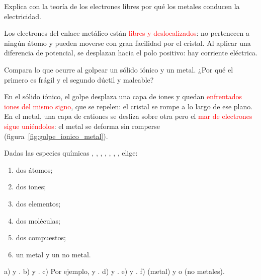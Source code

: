 \begin{exercise}
    Explica con la teoría de los electrones libres por qué los metales conducen la electricidad.
    \begin{solu}
        Los electrones del enlace metálico están \textcolor{red}{libres y deslocalizados}: no pertenecen a ningún átomo y pueden moverse con gran facilidad por el cristal. Al aplicar una diferencia de potencial, se desplazan hacia el polo positivo: hay corriente eléctrica.
    \end{solu}
\end{exercise}

\begin{exercise}
    Compara lo que ocurre al golpear un sólido iónico y un metal. ¿Por qué el primero es frágil y el segundo dúctil y maleable?
    \begin{solu}
        En el sólido iónico, el golpe desplaza una capa de iones y quedan \textcolor{red}{enfrentados iones del mismo signo}, que se repelen: el cristal se rompe a lo largo de ese plano. En el metal, una capa de cationes se desliza sobre otra pero el \textcolor{red}{mar de electrones sigue uniéndolos}: el metal se deforma sin romperse (figura~\ref{fig:golpe_ionico_metal}).
    \end{solu}
\end{exercise}

\begin{exercise}
    Dadas las especies químicas , , , , , , , elige:
    \begin{enumerate}[label=\alph*)]
        \item dos átomos;
        \item dos iones;
        \item dos elementos;
        \item dos moléculas;
        \item dos compuestos;
        \item un metal y un no metal.
    \end{enumerate}
    \begin{solu}
        a)  y . b)  y . c) Por ejemplo,  y . d)  y . e)  y . f)  (metal) y  o  (no metales).
    \end{solu}
\end{exercise}

